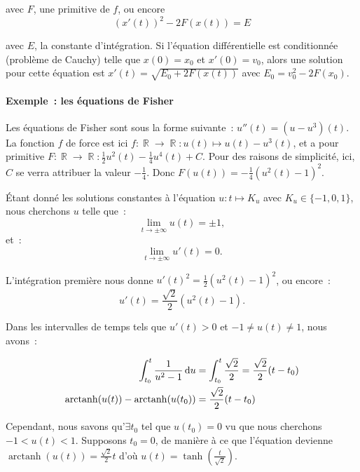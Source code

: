 \documentclass{article}
\DeclareMathOperator{\arctanh}{arctanh}
\DeclareMathOperator{\R}{\mathbb R}
\theoremstyle{definition}
\theoremstyle{remark}
\begin{document}
			avec $F$, une primitive de $f$, ou encore
			\[(x'(t))^2 - 2F(x(t)) = E\]

			avec $E$, la constante d'intégration. Si l'équation différentielle est conditionnée (problème de Cauchy) telle que $x(0) = x_0$ et $x'(0) = v_0$, alors
			une solution pour cette équation est $x'(t) = \sqrt{E_0 + 2F(x(t))}$ avec $E_0 = v_0^2 - 2F(x_0)$.

				\paragraph{Exemple~: les équations de Fisher} Les équations de Fisher sont sous la forme suivante~: $u''(t) = (u - u^3)(t)$. La fonction $f$ de force
				est ici $f : \R \to \R : u(t) \mapsto u(t) - u^3(t)$, et a pour primitive $F : \R \to \R : \frac 12u^2(t) - \frac 14u^4(t) + C$.
				Pour des raisons de simplicité, ici, $C$ se verra attribuer la valeur $-\frac 14$. Donc $F(u(t)) = -\frac 14(u^2(t) - 1)^2$.

				Étant donné les solutions constantes à l'équation $u : t \mapsto K_u$ avec $K_u \in \{-1, 0, 1\}$, nous cherchons $u$ telle que~:
				\[\lim_{t \to \pm \infty}u(t) = \pm 1,\]
				et~:
				\[\lim_{t \to \pm\infty}u'(t) = 0.\]
				
				L'intégration première nous donne $u'(t)^2 = \frac 12(u^2(t) - 1)^2$, ou encore~:
				\[u'(t) = \frac {\sqrt{2}}{2}(u^2(t) - 1).\]

				Dans les intervalles de temps tels que $u'(t) > 0$ et $-1 \neq u(t) \neq 1$, nous avons~:

				\[\begin{aligned}
					\int_{t_0}^t \frac {1}{u^2 - 1}\dif u &= \int_{t_0}^t \frac {\sqrt{2}}{2} = \frac{\sqrt{2}}{2} (t - t_0) \\
					\arctanh(u(t)) - \arctanh(u(t_0)) &= \frac{\sqrt{2}}{2} (t - t_0)
				\end{aligned}\]

				Cependant, nous savons qu'$\exists t_0$ tel que $u(t_0) = 0$ vu que nous cherchons $-1 < u(t) < 1$. Supposons $t_0 = 0$, de manière à ce que
				l'équation devienne $\arctanh(u(t)) = \frac {\sqrt{2}}{2}t$ d'où $u(t) = \tanh(\frac t{\sqrt 2})$.
\end{document}
